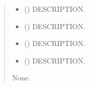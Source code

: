 \documentclass[letterpaper,10pt,english]{sphinxmanual}
\begin{document}
\begin{fulllineitems}
\label{\detokenize{MUFBVAR:MUFBVAR.mfbvar_funcs.mdd_}}
\pysigstartsignatures
{}
\pysigstopsignatures\begin{quote}\begin{description}
\begin{itemize}
\item {} 
\sphinxAtStartPar
{} () \textendash{} DESCRIPTION.

\item {} 
\sphinxAtStartPar
{} () \textendash{} DESCRIPTION.

\item {} 
\sphinxAtStartPar
{} () \textendash{} DESCRIPTION.

\item {} 
\sphinxAtStartPar
{} () \textendash{} DESCRIPTION.

\end{itemize}

\sphinxAtStartPar
None.

\end{description}\end{quote}

\end{fulllineitems}

\end{document}
